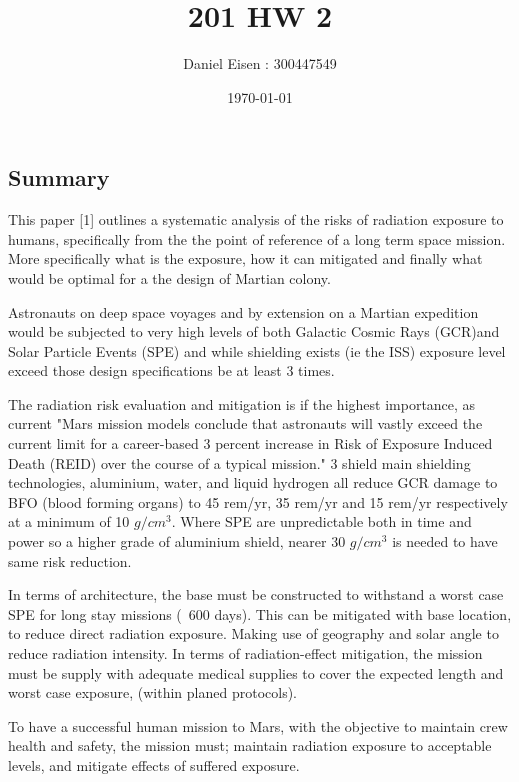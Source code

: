 \documentclass[11pt]{article}
\title{201 HW 2}
\author{Daniel Eisen : 300447549}
\date{\today}
\begin{document}
\maketitle
\begin{center}
\section*{Summary}
\end{center}

 This paper {[1]} outlines a systematic analysis of the risks of radiation exposure to humans, specifically from the the point of reference of a long term space mission. More specifically what is the exposure, how it can mitigated and finally what would be optimal for a the design of Martian colony.
 
 Astronauts on deep space voyages and by extension on a Martian expedition would be subjected to very high levels of both Galactic Cosmic Rays (GCR)and Solar Particle Events (SPE) and while shielding exists (ie the ISS) exposure level exceed those design specifications be at least 3 times.
 
 The radiation risk evaluation and mitigation is if the highest importance, as current "Mars mission models conclude that astronauts will vastly exceed the current limit for a career-based 3 percent increase in Risk of Exposure Induced Death (REID) over the course of a typical mission."  3 shield main shielding technologies, aluminium, water, and liquid hydrogen all reduce GCR damage to BFO (blood forming organs) to 45 rem/yr, 35 rem/yr and 15 rem/yr respectively at a minimum of 10 $g/cm^{3}$. Where SPE are unpredictable both in time and power so a higher grade of aluminium shield, nearer 30 $g/cm^{3}$ is needed to have same risk reduction.
 
 In terms of architecture, the base must be constructed to withstand a worst case SPE for long stay missions (~600 days). This can be mitigated with base location, to reduce direct radiation exposure. Making use of geography and solar angle to reduce radiation intensity. In terms of radiation-effect mitigation, the mission must be supply with adequate medical supplies to cover the expected length and worst case exposure, (within planed protocols).
 
To have a successful human mission to Mars, with the objective to maintain crew health and safety, the mission must; maintain radiation exposure to acceptable levels, and mitigate effects of suffered exposure.\\ 
\end{document}

